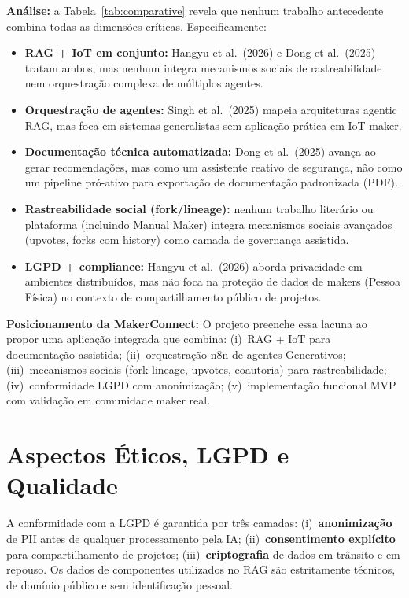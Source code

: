 \documentclass[portuguese]{sbcreviews-2025}%
\begin{document}
\textbf{Análise:} a Tabela~\ref{tab:comparative} revela que nenhum trabalho antecedente combina todas as dimensões críticas. Especificamente:

\begin{itemize}
\item \textbf{RAG + IoT em conjunto:} Hangyu et al.~(2026) e Dong et al.~(2025) tratam ambos, mas nenhum integra mecanismos sociais de rastreabilidade nem orquestração complexa de múltiplos agentes.

\item \textbf{Orquestração de agentes:} Singh et al.~(2025) mapeia arquiteturas agentic RAG, mas foca em sistemas generalistas sem aplicação prática em IoT maker.

\item \textbf{Documentação técnica automatizada:} Dong et al.~(2025) avança ao gerar recomendações, mas como um assistente reativo de segurança, não como um pipeline pró-ativo para exportação de documentação padronizada (PDF).

\item \textbf{Rastreabilidade social (fork/lineage):} nenhum trabalho literário ou plataforma (incluindo Manual Maker) integra mecanismos sociais avançados (upvotes, forks com history) como camada de governança assistida.

\item \textbf{LGPD + compliance:} Hangyu et al.~(2026) aborda privacidade em ambientes distribuídos, mas não foca na proteção de dados de makers (Pessoa Física) no contexto de compartilhamento público de projetos.
\end{itemize}

\textbf{Posicionamento da MakerConnect:} O projeto preenche essa lacuna ao propor uma aplicação integrada que combina: (i)~RAG + IoT para documentação assistida; (ii)~orquestração n8n de agentes Generativos; (iii)~mecanismos sociais (fork lineage, upvotes, coautoria) para rastreabilidade; (iv)~conformidade LGPD com anonimização; (v)~implementação funcional MVP com validação em comunidade maker real.

\section{Aspectos Éticos, LGPD e Qualidade}

A conformidade com a LGPD é garantida por três camadas: (i)~\textbf{anonimização} de PII antes de qualquer processamento pela IA; (ii)~\textbf{consentimento explícito} para compartilhamento de projetos; (iii)~\textbf{criptografia} de dados em trânsito e em repouso. Os dados de componentes utilizados no RAG são estritamente técnicos, de domínio público e sem identificação pessoal.
\end{document}
